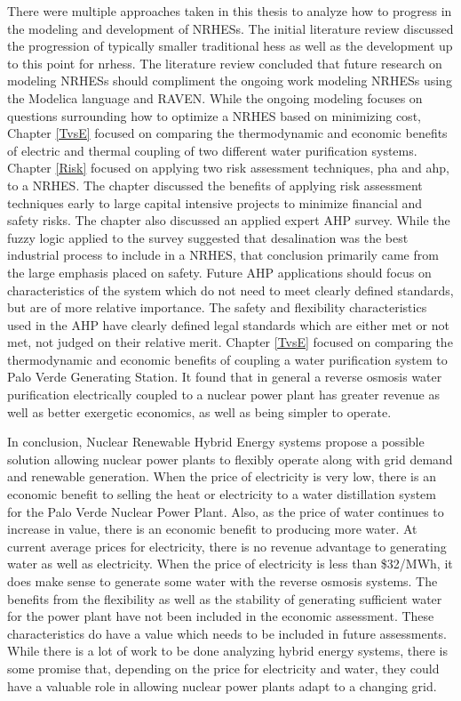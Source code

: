  There were multiple approaches taken in this thesis to analyze how to progress in the modeling and development of NRHESs. The initial literature review discussed the progression of typically smaller traditional \ac{hes}s as well as the development up to this point for \ac{nrhes}s.  The literature review concluded that future research on modeling NRHESs should compliment the ongoing work modeling NRHESs using the Modelica language and RAVEN.  While the ongoing modeling focuses on questions surrounding how to optimize a NRHES based on minimizing cost, Chapter \ref{TvsE} focused on comparing the thermodynamic and economic benefits of electric and thermal coupling of two different water purification systems. Chapter \ref{Risk} focused on applying two risk assessment techniques, \ac{pha} and \ac{ahp}, to a NRHES.  The chapter discussed the benefits of applying risk assessment techniques early to large capital intensive projects to minimize financial and safety risks.  The chapter also discussed an applied expert AHP survey.  While the fuzzy logic applied to the survey suggested that desalination was the best industrial process to include in a NRHES, that conclusion primarily came from the large emphasis placed on safety.  Future AHP applications should focus on characteristics of the system which do not need to meet clearly defined standards, but are of more relative importance.  The safety and flexibility characteristics used in the AHP have clearly defined legal standards which are either met or not met, not judged on their relative merit.  Chapter \ref{TvsE} focused on comparing the thermodynamic and economic benefits of coupling a water purification system to Palo Verde Generating Station. It found that in general a reverse osmosis water purification electrically coupled to a nuclear power plant has greater revenue as well as better exergetic economics, as well as being simpler to operate.

 In conclusion, Nuclear Renewable Hybrid Energy systems propose a possible solution allowing nuclear power plants to flexibly operate along with grid demand and renewable generation.  When the price of electricity is very low, there is an economic benefit to selling the heat or electricity to a water distillation system for the Palo Verde Nuclear Power Plant. Also, as the price of water continues to increase in value, there is an economic benefit to producing more water. At current average prices for electricity, there is no revenue advantage to generating water as well as electricity. When the price of electricity is less than \$32/MWh, it does make sense to generate some water with the reverse osmosis systems. The benefits from the flexibility as well as the stability of generating sufficient water for the power plant have not been included in the economic assessment. These characteristics do have a value which needs to be included in future assessments. While there is a lot of work to be done analyzing hybrid energy systems, there is some promise that, depending on the price for electricity and water, they could have a valuable role in allowing nuclear power plants adapt to a changing grid.
